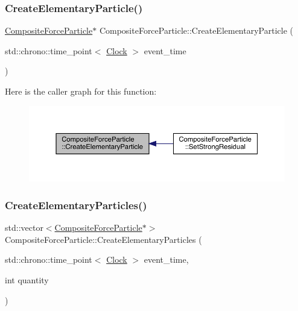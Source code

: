 \subsubsection{\texorpdfstring{Create\+Elementary\+Particle()}{CreateElementaryParticle()}}
{\footnotesize\ttfamily \hyperlink{class_composite_force_particle}{Composite\+Force\+Particle}$\ast$ Composite\+Force\+Particle\+::\+Create\+Elementary\+Particle (\begin{DoxyParamCaption}\item[{std\+::chrono\+::time\+\_\+point$<$ \hyperlink{universe_8h_a0ef8d951d1ca5ab3cfaf7ab4c7a6fd80}{Clock} $>$}]{event\+\_\+time }\end{DoxyParamCaption})}

Here is the caller graph for this function\+:\nopagebreak
\begin{figure}[H]
\begin{center}
\leavevmode
\includegraphics[width=350pt]{class_composite_force_particle_a0806069e389e30c63572c4cd6b9776d7_icgraph}
\end{center}
\end{figure}
\mbox{\label{class_composite_force_particle_afff866fe6f363c33c3b49fcca9005706}} 
\subsubsection{\texorpdfstring{Create\+Elementary\+Particles()}{CreateElementaryParticles()}}
{\footnotesize\ttfamily std\+::vector$<$\hyperlink{class_composite_force_particle}{Composite\+Force\+Particle}$\ast$$>$ Composite\+Force\+Particle\+::\+Create\+Elementary\+Particles (\begin{DoxyParamCaption}\item[{std\+::chrono\+::time\+\_\+point$<$ \hyperlink{universe_8h_a0ef8d951d1ca5ab3cfaf7ab4c7a6fd80}{Clock} $>$}]{event\+\_\+time,  }\item[{int}]{quantity }\end{DoxyParamCaption})}

